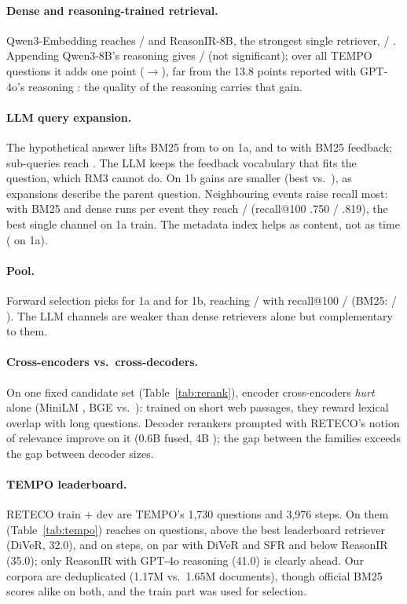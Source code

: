 \paragraph{Dense and reasoning-trained retrieval.} Qwen3-Embedding reaches \rDenseA{} / \rDenseB{}
and ReasonIR-8B, the strongest single retriever, \rRirA{} / \rRirB{}. Appending Qwen3-8B's
reasoning gives \rRirReasonA{} / \rRirReasonB{} (not significant); over all TEMPO questions it adds
one point (\pooledRirA{}$\rightarrow$\pooledRirReasonA{}), far from the 13.8 points reported with
GPT-4o's reasoning \citep{abdallah2026tempo}: the quality of the reasoning carries that gain.

\paragraph{LLM query expansion.} The hypothetical answer lifts BM25 from \rBmA{} to \rQtdA{} on
1a, and to \rQtdFbA{} with BM25 feedback; sub-queries reach \rMultiA{}. The LLM keeps the feedback
vocabulary that fits the question, which RM3 cannot do. On 1b gains are smaller (best
\rMultiFbB{} vs.\ \rBmB{}), as expansions describe the parent question. Neighbouring events raise
recall most: with BM25 and dense runs per event they reach \rNbrHybridA{} / \rNbrHybridB{}
(recall@100 .750 / .819), the best single channel on 1a train. The metadata index helps as
content, not as time (\rMetaKwA{} on 1a).

\paragraph{Pool.} Forward selection picks \poolChannelsA{} for 1a and \poolChannelsB{} for 1b,
reaching \rPoolA{} / \rPoolB{} with recall@100 \rRecallPoolA{} / \rRecallPoolB{} (BM25:
\rRecallBmA{} / \rRecallBmB{}). The LLM channels are weaker than dense retrievers alone but
complementary to them.



\paragraph{Cross-encoders vs.\ cross-decoders.} On one fixed candidate set (Table~\ref{tab:rerank}),
encoder cross-encoders \emph{hurt} alone (MiniLM \rMiniLMA{}, BGE \rBgeA{} vs.\ \rBmDenseA{}):
trained on short web passages, they reward lexical overlap with long questions. Decoder rerankers
prompted with RETECO's notion of relevance improve on it (0.6B \rQsmallRRPoolA{} fused, 4B
\rQbigRRA{}); the gap between the families exceeds the gap between decoder sizes.

\paragraph{TEMPO leaderboard.} RETECO train $+$ dev are TEMPO's 1{,}730 questions and 3{,}976
steps. On them (Table~\ref{tab:tempo}) \sys reaches \pooledFinalA{} on questions, above the best
leaderboard retriever (DiVeR, 32.0), and \pooledFinalB{} on steps, on par with DiVeR and SFR and
below ReasonIR (35.0); only ReasonIR with GPT-4o reasoning (41.0) is clearly ahead. Our corpora
are deduplicated (1.17M vs.\ 1.65M documents), though official BM25 scores alike on both, and the
train part was used for selection.

